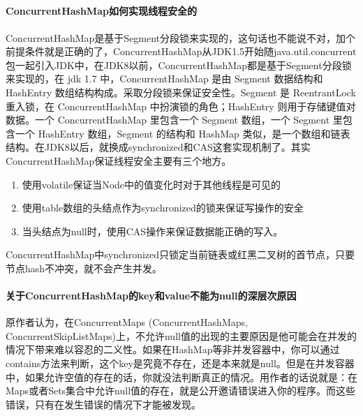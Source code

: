 \documentclass[../../../interview-questions.tex]{subfiles}
\begin{document}
\subsection{\color{red}{ConcurrentHashMap}}

\paragraph{ConcurrentHashMap如何实现线程安全的}

ConcurrentHashMap是基于Segment分段锁来实现的，这句话也不能说不对，加个前提条件就是正确的了，ConcurrentHashMap从JDK1.5开始随java.util.concurrent包一起引入JDK中，在JDK8以前，ConcurrentHashMap都是基于Segment分段锁来实现的，在 jdk 1.7 中，ConcurrentHashMap 是由 Segment 数据结构和 HashEntry 数组结构构成。采取分段锁来保证安全性。Segment 是 ReentrantLock 重入锁，在 ConcurrentHashMap 中扮演锁的角色；HashEntry 则用于存储键值对数据。一个 ConcurrentHashMap 里包含一个 Segment 数组，一个 Segment 里包含一个 HashEntry 数组，Segment 的结构和 HashMap 类似，是一个数组和链表结构。在JDK8以后，就换成synchronized和CAS这套实现机制了。其实ConcurrentHashMap保证线程安全主要有三个地方。

\begin{enumerate}
    \item {使用volatile保证当Node中的值变化时对于其他线程是可见的}
    \item {使用table数组的头结点作为synchronized的锁来保证写操作的安全}
    \item {当头结点为null时，使用CAS操作来保证数据能正确的写入。}
\end{enumerate}

ConcurrentHashMap中synchronized只锁定当前链表或红黑二叉树的首节点，只要节点hash不冲突，就不会产生并发。

\paragraph{关于ConcurrentHashMap的key和value不能为null的深层次原因}

原作者认为，在ConcurrentMaps (ConcurrentHashMaps, ConcurrentSkipListMaps)上，不允许null值的出现的主要原因是他可能会在并发的情况下带来难以容忍的二义性。如果在HashMap等非并发容器中，你可以通过contains方法来判断，这个key是究竟不存在，还是本来就是null。但是在并发容器中，如果允许空值的存在的话，你就没法判断真正的情况。用作者的话说就是：在Maps或者Sets集合中允许null值的存在，就是公开邀请错误进入你的程序。而这些错误，只有在发生错误的情况下才能被发现。
\end{document}
